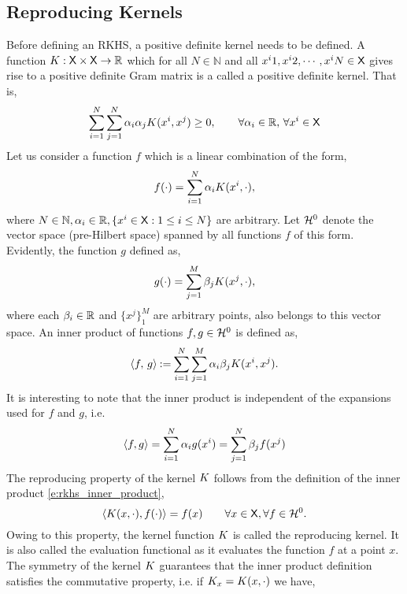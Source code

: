 \subsection{Reproducing Kernels} 
Before defining an RKHS, a positive definite kernel needs to be defined. A function $K : {\sf X} \times {\sf X} \to \mathbb{R}$ which for all $N \in \mathbb{N}$ and all $x^i1,x^i2,\cdots,x^iN \in {\sf X}$ gives rise to a positive definite Gram matrix is a called a positive definite kernel. That is, 
\begin{equation}
\sum_{i=1}^N \sum_{j=1}^N \alpha_i \alpha_j K(x^i,x^j) \geq 0, \qquad \forall \alpha_i \in \mathbb{R}, \, \forall x^i \in {\sf X} 
\end{equation}
Let us consider a function $f$ which is a linear combination of the form,
\begin{equation}
f(\cdot) = \sum_{i=1}^N \alpha_i \Kern(x^i, \cdot),
\label{e:rkhs_f_rkhs}
\end{equation}
where $N \in \mathbb{N}, \alpha_i \in \mathbb{R}, \{ x^i \in {\sf X}: 1\leq i \leq N \}$ are arbitrary. Let ${\cal H}^0$ denote the vector space (pre-Hilbert space) spanned by all functions $f$ of this form. Evidently, the function $g$ defined as,  
\begin{equation}
g(\cdot) = \sum_{j=1}^M \rkhsparam_j \Kern(x^j, \cdot),
\label{e:rkhs_g_rkhs}
\end{equation}
where each $\beta_i \in \mathbb{R}$ and $\{x^j\}_1^M$ are arbitrary points, also belongs to this vector space.  An inner product of functions $f,g \in {\cal H}^0$ is defined as,
\begin{equation}
\langle f,\, g \rangle \eqdef \sum_{i=1}^N \sum_{j=1}^M \alpha_i \rkhsparam_j \Kern(x^i, x^j).
\label{e:rkhs_inner_product}
\end{equation}
It is interesting to note that the inner product is independent of the expansions used for $f$ and $g$, i.e.
\begin{equation}
\langle f, g \rangle = \sum_{i=1}^N \alpha_i g(x^i) = \sum_{j=1}^N \beta_j f(x^j)
\end{equation}
The reproducing property of the kernel $K$ follows from the definition of the inner product \eqref{e:rkhs_inner_product},
\begin{equation}
\langle \Kern(x,\cdot), f(\cdot)\rangle = f(x) \qquad \forall x \in \state, \forall f \in \clH^0.
\label{e:rkhs_rep_property}
\end{equation}
Owing to this property, the kernel function $K$ is called the reproducing kernel. It is also called the evaluation functional as it evaluates the function $f$ at a point $x$. The symmetry of the kernel $K$ guarantees that the inner product definition satisfies the commutative property, i.e. if $K_x = K(x, \cdot)$ we have,
